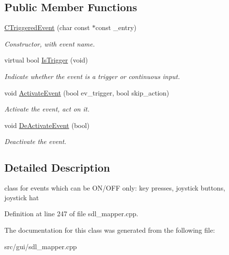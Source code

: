 \subsection*{Public Member Functions}
\begin{DoxyCompactItemize}
\item 
\hypertarget{classCTriggeredEvent_ac9f3fc82121e3632950dfd89e37fc90d}{\hyperlink{classCTriggeredEvent_ac9f3fc82121e3632950dfd89e37fc90d}{C\-Triggered\-Event} (char const $\ast$const \-\_\-entry)}\label{classCTriggeredEvent_ac9f3fc82121e3632950dfd89e37fc90d}

\begin{DoxyCompactList}\small\item\em Constructor, with event name. \end{DoxyCompactList}\item 
\hypertarget{classCTriggeredEvent_a4ab6cb9bc929db0b4281218ff1205cb6}{virtual bool \hyperlink{classCTriggeredEvent_a4ab6cb9bc929db0b4281218ff1205cb6}{Is\-Trigger} (void)}\label{classCTriggeredEvent_a4ab6cb9bc929db0b4281218ff1205cb6}

\begin{DoxyCompactList}\small\item\em Indicate whether the event is a trigger or continuous input. \end{DoxyCompactList}\item 
\hypertarget{classCTriggeredEvent_ab438d4c740739216ae049088f887e6bb}{void \hyperlink{classCTriggeredEvent_ab438d4c740739216ae049088f887e6bb}{Activate\-Event} (bool ev\-\_\-trigger, bool skip\-\_\-action)}\label{classCTriggeredEvent_ab438d4c740739216ae049088f887e6bb}

\begin{DoxyCompactList}\small\item\em Activate the event, act on it. \end{DoxyCompactList}\item 
\hypertarget{classCTriggeredEvent_a14ad33e00067cce7d4a9266888e24192}{void \hyperlink{classCTriggeredEvent_a14ad33e00067cce7d4a9266888e24192}{De\-Activate\-Event} (bool)}\label{classCTriggeredEvent_a14ad33e00067cce7d4a9266888e24192}

\begin{DoxyCompactList}\small\item\em Deactivate the event. \end{DoxyCompactList}\end{DoxyCompactItemize}


\subsection{Detailed Description}
class for events which can be O\-N/\-O\-F\-F only\-: key presses, joystick buttons, joystick hat 

Definition at line 247 of file sdl\-\_\-mapper.\-cpp.



The documentation for this class was generated from the following file\-:\begin{DoxyCompactItemize}
\item 
src/gui/sdl\-\_\-mapper.\-cpp\end{DoxyCompactItemize}
